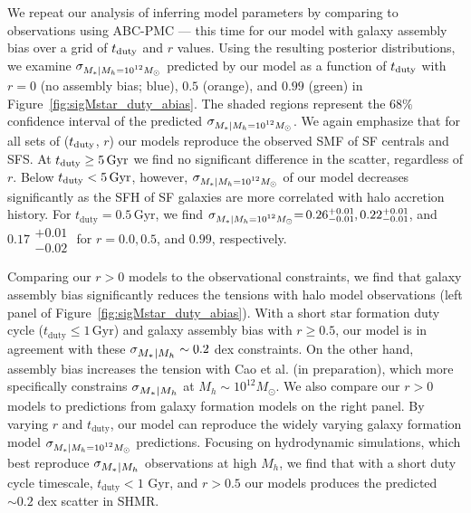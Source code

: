 \documentclass[12pt, letterpaper, preprint, tighten]{aastex62}
\newcommand{\siglogm}{\sigma_{\scaleto{M_*|M_h}{8pt}}}
\newcommand{\sigtwe}{\sigma_{\scaleto{M_*|M_h=10^{12}M_\odot}{8pt}}}
\begin{document}
We repeat our analysis of inferring model parameters by comparing to observations
using ABC-PMC --- this time for our model with galaxy assembly bias over a grid of
$t_{\rm duty}$ and $r$ values. Using the resulting posterior distributions, we
examine $\sigtwe$ predicted by our model as a function of $t_{\rm duty}$ with $r=0$ 
(no assembly bias; blue), $0.5$ (orange), and $0.99$ (green) in 
Figure~\ref{fig:sigMstar_duty_abias}. The shaded regions represent the $68\%$ 
confidence interval of the predicted $\sigtwe$. We again emphasize that for all 
sets of ($t_{\rm duty}$, $r$) our models reproduce the observed SMF of SF centrals 
and SFS. At $t_{\rm duty} \geq 5\,{\rm Gyr}$ we find no significant difference 
in the scatter, regardless of $r$. Below $t_{\rm duty} < 5\,\mathrm{Gyr}$, however, 
$\sigtwe$ of our model decreases significantly as the SFH of SF galaxies are more 
correlated with halo accretion history. For $t_\mathrm{duty} = 0.5\,\mathrm{Gyr}$, we find
$\sigtwe{=}\,0.26\substack{+0.01\\-0.01},
0.22\substack{+0.01\\-0.01}$, and $0.17\substack{+0.01\\-0.02} $
for $r = 0.0, 0.5$, and $0.99$, respectively.

Comparing our $r > 0$ models to the observational constraints, we find that 
galaxy assembly bias significantly reduces the tensions with halo model observations 
(left panel of Figure~\ref{fig:sigMstar_duty_abias}).
With a short star formation duty cycle ($t_\mathrm{duty} \leq 1\,\mathrm{Gyr}$)
and galaxy assembly bias with $r \ge 0.5$, our model is in agreement with
these $\siglogm \sim 0.2$ dex constraints. On the other hand,
assembly bias increases the tension with
Cao et al. (in preparation), which more specifically constrains $\siglogm$ 
at $M_h\sim 10^{12}M_\odot$. We also compare our $r > 0$ models to
predictions from galaxy formation models on the right panel.
By varying $r$ and $t_\mathrm{duty}$, our model can reproduce the widely varying 
galaxy formation model $\sigtwe$ predictions.
Focusing on hydrodynamic simulations, which best reproduce $\siglogm$
observations at high $M_h$, we find that with a short duty cycle timescale,
$t_\mathrm{duty} < 1$ Gyr, and $r > 0.5$ our models produces the predicted 
$\sim0.2$ dex scatter in SHMR.
\end{document}
